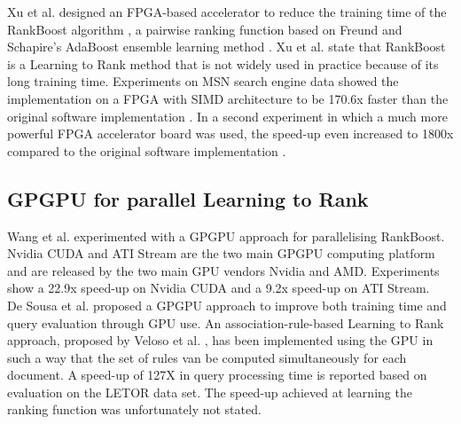 Xu et al. \cite{Xu2007b,Xu2009} designed an \acs{FPGA}-based accelerator to reduce the training time of the RankBoost algorithm \cite{Freund2003}, a pairwise ranking function based on Freund and Schapire's AdaBoost ensemble learning method \cite{Freund1997}. Xu et al. \cite{Xu2009} state that RankBoost is a Learning to Rank method that is not widely used in practice because of its long training time. Experiments on MSN search engine data showed the implementation on a \ac{FPGA} with \ac{SIMD} architecture to be 170.6x faster than the original software implementation \cite{Xu2007b}. In a second experiment in which a much more powerful \ac{FPGA} accelerator board was used, the speed-up even increased to 1800x compared to the original software implementation \cite{Xu2009}.\\

\subsection{GPGPU for parallel Learning to Rank}
Wang et al. \cite{Wang2009} experimented with a \ac{GPGPU} approach for parallelising RankBoost. Nvidia \ac{CUDA} and ATI Stream are the two main \ac{GPGPU} computing platform and are released by the two main \ac{GPU} vendors Nvidia and AMD. Experiments show a 22.9x speed-up on Nvidia \ac{CUDA} and a 9.2x speed-up on ATI Stream.\\

De Sousa et al. \cite{DeSousa2012} proposed a \ac{GPGPU} approach to improve both training time and query evaluation through \ac{GPU} use. An association-rule-based Learning to Rank approach, proposed by Veloso et al. \cite{Veloso2008}, has been implemented using the \ac{GPU} in such a way that the set of rules van be computed simultaneously for each document. A speed-up of 127X in query processing time is reported based on evaluation on the LETOR data set. The speed-up achieved at learning the ranking function was unfortunately not stated.\\

